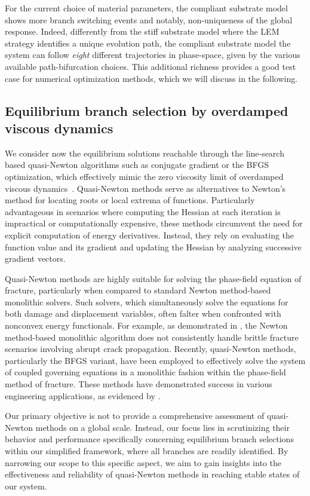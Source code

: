 \documentclass[10pt]{article}
\begin{document}
For the current choice of material parameters, the compliant substrate model shows more branch switching events and {notably,} non-uniqueness of the global response.
Indeed, {differently from} the stiff substrate model {where} the LEM strategy identifies a unique evolution path, the compliant substrate model the system can follow \emph{eight} different trajectories in phase-space, given by the various available path-bifurcation choices.
This additional richness provides a good test case for numerical optimization methods, which we will discuss in the following.

\subsection{Equilibrium branch selection by overdamped viscous dynamics}
We consider now the equilibrium solutions reachable through the line-search based quasi-Newton algorithms such as  conjugate gradient or the BFGS optimization, which effectively  mimic the zero viscosity limit of overdamped viscous dynamics~\cite{SALMAN2012219}. Quasi-Newton methods serve as alternatives to Newton's method for locating roots or local extrema of functions. Particularly advantageous in scenarios where computing the Hessian at each iteration is impractical or computationally expensive, these methods circumvent the need for explicit computation of energy derivatives. Instead, they rely on evaluating the function value and its gradient and updating the Hessian by analyzing successive gradient vectors.

Quasi-Newton methods are highly suitable for solving the phase-field equation of fracture, particularly when compared to standard Newton method-based monolithic solvers. Such solvers, which simultaneously  solve the equations for both damage and displacement variables, often falter when confronted with nonconvex energy functionals. For example, as demonstrated in \cite{Wick2017-bo}, the Newton method-based monolithic algorithm does not consistently handle brittle fracture scenarios involving abrupt crack propagation. Recently, quasi-Newton methods, particularly the BFGS variant, have been employed to effectively solve the system of coupled governing equations in a monolithic fashion within the phase-field method of fracture. These methods have demonstrated success in various engineering applications, as evidenced by \cite{Kristensen2020-zy,Wu2020-qk,Salman2021-mn,Liu2022-ix}.

Our primary objective is not to provide a comprehensive assessment of quasi-Newton methods on a global scale. Instead, our focus lies in scrutinizing their behavior and performance specifically concerning equilibrium branch selections within our simplified framework, where all branches are readily identified. By narrowing our scope to this specific aspect, we aim to gain insights into the effectiveness and reliability of quasi-Newton methods in reaching stable states of our system.
\end{document}
